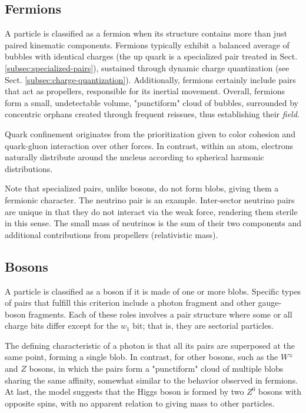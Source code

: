 \documentclass[12pt,english]{article}
\begin{document}
\subsection{Fermions}
A particle is classified as a fermion when its structure contains more than just paired kinematic components. Fermions typically exhibit a balanced average of bubbles with identical charges (the up quark is a specialized pair treated in Sect. \ref{subsec:specialized-pairs}), sustained through dynamic charge quantization (see Sect. \ref{subsec:charge-quantization}). Additionally, fermions certainly include pairs that act as propellers, responsible for its inertial movement. Overall, fermions form a small, undetectable volume, "punctiform" cloud of bubbles, surrounded by concentric orphans created through frequent reissues, thus establishing their \textit{field}.
 
Quark confinement originates from the prioritization given to color cohesion and quark-gluon interaction over other forces. In contrast, within an atom, electrons naturally distribute around the nucleus according to spherical harmonic distributions.

Note that specialized pairs, unlike bosons, do not form blobs, giving them a fermionic character. The neutrino pair is an example. Inter-sector neutrino pairs are unique in that they do not interact via the weak force, rendering them sterile in this sense. The small mass of neutrinos is the sum of their two components and additional contributions from propellers (relativistic mass).

\subsection{Bosons}\label{bosons}
A particle is classified as a boson if it is made of one or more blobs. Specific types of pairs that fulfill this criterion include a photon fragment and other gauge-boson fragments. Each of these roles involves a pair structure where some or all charge bits differ except for the $w_{1}$ bit; that is, they are sectorial particles. 

The defining characteristic of a photon is that all its pairs are superposed at the same point, forming a single blob. In contrast, for other bosons, such as the $W^{\pm}$ and $Z$ bosons, in which the pairs form a "punctiform" cloud of multiple blobs sharing the same affinity, somewhat similar to the behavior observed in fermions. At last, the model suggests that the Higgs boson is formed by two $Z^0$ bosons with opposite spins, with no apparent relation to giving mass to other particles.
\end{document}
